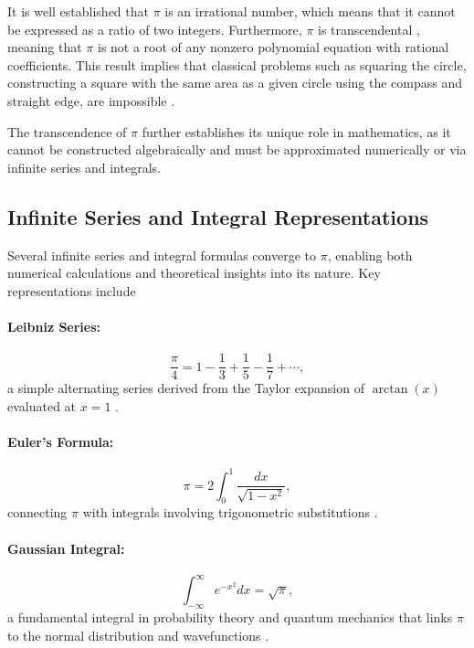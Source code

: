 \documentclass[12pt,a4paper]{article}
\begin{document}
It is well established that \(\pi\) is an irrational number, which means that it cannot be expressed as a ratio of two integers. Furthermore, \(\pi\) is transcendental \cite{lindemann-transcendence}, meaning that \(\pi\) is not a root of any nonzero polynomial equation with rational coefficients. This result implies that classical problems such as squaring the circle, constructing a square with the same area as a given circle using the compass and straight edge, are impossible \cite{impossibility-squaring-circle}.

The transcendence of \(\pi\) further establishes its unique role in mathematics, as it cannot be constructed algebraically and must be approximated numerically or via infinite series and integrals.

\subsection{Infinite Series and Integral Representations}

Several infinite series and integral formulas converge to \(\pi\), enabling both numerical calculations and theoretical insights into its nature. Key representations include

\paragraph{Leibniz Series:}
\begin{equation}
\frac{\pi}{4} = 1 - \frac{1}{3} + \frac{1}{5} - \frac{1}{7} + \cdots,
\end{equation}
a simple alternating series derived from the Taylor expansion of \(\arctan(x)\) evaluated at \(x=1\) \cite{leibniz-series}.

\paragraph{Euler's Formula:}
\begin{equation}
\pi = 2 \int_{0}^{1} \frac{dx}{\sqrt{1 - x^2}},
\end{equation}
connecting \(\pi\) with integrals involving trigonometric substitutions \cite{euler-integral}.

\paragraph{Gaussian Integral:}
\begin{equation}
\int_{-\infty}^{\infty} e^{-x^2} dx = \sqrt{\pi},
\end{equation}
a fundamental integral in probability theory and quantum mechanics that links \(\pi\) to the normal distribution and wavefunctions \cite{gaussian-integral}.
\end{document}
